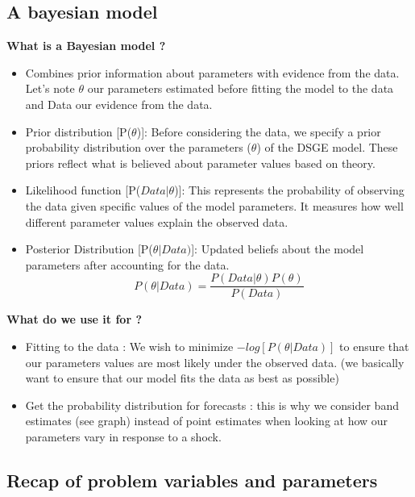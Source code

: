 \documentclass{article}
\begin{document}
\subsection{A bayesian model}
\textbf{What is a Bayesian model ?}
\begin{itemize}
    \item Combines prior information about parameters with evidence from the data. Let's note $\theta$ our parameters estimated before fitting the model to the data and Data our evidence from the data. 
    \item Prior distribution [P($\theta$)]: Before considering the data, we specify a prior probability distribution over the parameters ($\theta$) of the DSGE model. These priors reflect what is believed about parameter values based on theory.
    \item Likelihood function [P($Data|\theta$)]: This represents the probability of observing the data given specific values of the model parameters. It measures how well different parameter values explain the observed data.
    \item Posterior Distribution [P($\theta|Data)$]: Updated beliefs about the model parameters after accounting for the data.
    \begin{equation}
        P(\theta|Data) = \frac{P(Data|\theta)P(\theta)}{P(Data)}
    \end{equation}
\end{itemize}
\textbf{What do we use it for ?}
\begin{itemize}
    \item Fitting to the data : We wish to minimize $-log[P(\theta|Data)]$ to ensure that our parameters values are most likely under the observed data. (we basically want to ensure that our model fits the data as best as possible)
    \item Get the probability distribution for forecasts : this is why we consider band estimates (see graph) instead of point estimates when looking at how our parameters vary in response to a shock. 
\end{itemize}


\subsection{Recap of problem variables and parameters}
\end{document}
